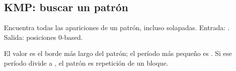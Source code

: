 \subsection{KMP: buscar un patrón}\label{rec:kmp}

Encuentra todas las apariciones de un patrón, incluso solapadas. Entrada:
. Salida: posiciones 0-based.




El valor  es el borde más largo del patrón; el período más
pequeño es . Si ese período divide a , el
patrón es repetición de un bloque.